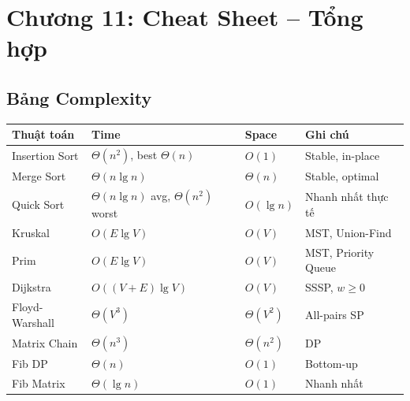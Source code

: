 \documentclass[10pt]{article}
\newcounter{none}
\begin{document}
\section{Chương 11: Cheat Sheet -- Tổng hợp}\label{cheat-sheet-tux1ed5ng-hux1ee3p}

\subsection{Bảng Complexity}\label{bux1ea3ng-complexity}

{\def\LTcaptype{none} %
\begin{longtable}[]{@{}
  >{\raggedright\arraybackslash}p{}
  >{\raggedright\arraybackslash}p{}
  >{\raggedright\arraybackslash}p{}
  >{\raggedright\arraybackslash}p{}@{}}
\toprule\noalign{}
\begin{minipage}[b]{\linewidth}\raggedright
Thuật toán
\end{minipage} & \begin{minipage}[b]{\linewidth}\raggedright
Time
\end{minipage} & \begin{minipage}[b]{\linewidth}\raggedright
Space
\end{minipage} & \begin{minipage}[b]{\linewidth}\raggedright
Ghi chú
\end{minipage} \\
\midrule\noalign{}
\endhead
\bottomrule\noalign{}
\endlastfoot
Insertion Sort & \(\Theta(n^2)\), best \(\Theta(n)\) & \(O(1)\) &
Stable, in-place \\
Merge Sort & \(\Theta(n \lg n)\) & \(\Theta(n)\) & Stable, optimal \\
Quick Sort & \(\Theta(n \lg n)\) avg, \(\Theta(n^2)\) worst &
\(O(\lg n)\) & Nhanh nhất thực tế \\
Kruskal & \(O(E \lg V)\) & \(O(V)\) & MST, Union-Find \\
Prim & \(O(E \lg V)\) & \(O(V)\) & MST, Priority Queue \\
Dijkstra & \(O((V+E) \lg V)\) & \(O(V)\) & SSSP, \(w \geq 0\) \\
Floyd-Warshall & \(\Theta(V^3)\) & \(\Theta(V^2)\) & All-pairs SP \\
Matrix Chain & \(\Theta(n^3)\) & \(\Theta(n^2)\) & DP \\
Fib DP & \(\Theta(n)\) & \(O(1)\) & Bottom-up \\
Fib Matrix & \(\Theta(\lg n)\) & \(O(1)\) & Nhanh nhất \\
\end{longtable}
}
\label{tab:cheat-complexity}
\end{document}
